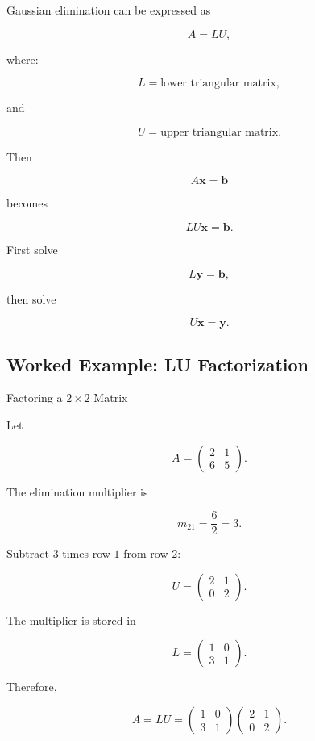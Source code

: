 Gaussian elimination can be expressed as

\[
\boxed{
A
=
LU,
}
\]

where:

\[
L
=
\text{lower triangular matrix},
\]

and

\[
U
=
\text{upper triangular matrix}.
\]

Then

\[
A\mathbf{x}
=
\mathbf{b}
\]

becomes

\[
LU\mathbf{x}
=
\mathbf{b}.
\]

First solve

\[
\boxed{
L\mathbf{y}
=
\mathbf{b},
}
\]

then solve

\[
\boxed{
U\mathbf{x}
=
\mathbf{y}.
}
\]

\subsection{Worked Example: LU Factorization}
\label{subsec:worked-lu-factorization}

\begin{workedexamplebox}{Factoring a \(2\times2\) Matrix}

Let

\[
A
=
\begin{pmatrix}
2&1\\
6&5
\end{pmatrix}.
\]

The elimination multiplier is

\[
m_{21}
=
\frac62
=
3.
\]

Subtract \(3\) times row \(1\) from row \(2\):

\[
U
=
\begin{pmatrix}
2&1\\
0&2
\end{pmatrix}.
\]

The multiplier is stored in

\[
L
=
\begin{pmatrix}
1&0\\
3&1
\end{pmatrix}.
\]

Therefore,

\begin{answerbox}
\[
\boxed{
A
=
LU
=
\begin{pmatrix}
1&0\\
3&1
\end{pmatrix}
\begin{pmatrix}
2&1\\
0&2
\end{pmatrix}.
}
\]
\end{answerbox}

\end{workedexamplebox}


